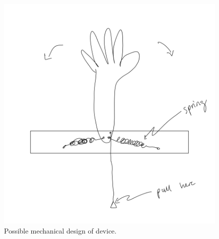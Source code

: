 \documentclass[11pt]{report}
\begin{document}
\begin{figure}[ht]
\centering
\includegraphics[scale=0.6]{"images/wavemachine_sketch.png"}
\caption{Possible mechanical design of device.}
\label{fig:sketch}
\end{figure}
\end{document}
